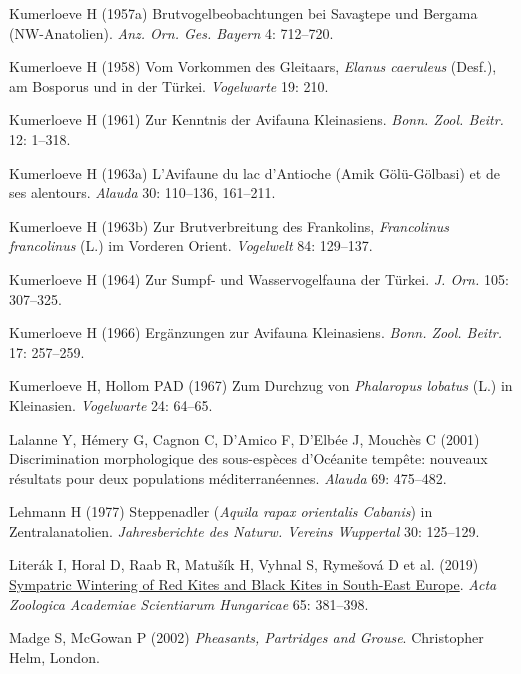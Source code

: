 \documentclass[
  letterpaper,
  DIV=11,
  numbers=noendperiod]{scrreprt}
\newlength{\cslhangindent}
\newenvironment{CSLReferences}[2] %
 {\begin{list}{}{%
  \setlength{\itemindent}{0pt}
  \setlength{\leftmargin}{0pt}
  \setlength{\parsep}{0pt}
  \ifodd #1
   \setlength{\leftmargin}{\cslhangindent}
   \setlength{\itemindent}{-1\cslhangindent}
  \fi
  \setlength{\itemsep}{#2\baselineskip}}}
 {\end{list}}
\begin{document}
\begin{CSLReferences}{0}{1}
Kumerloeve H (1957a) {Brutvogelbeobachtungen bei Savaştepe und Bergama
(NW-Anatolien)}. \emph{Anz. Orn. Ges. Bayern} 4: 712--720.

Kumerloeve H (1958) {Vom Vorkommen des Gleitaars, \emph{Elanus
caeruleus} (Desf.), am Bosporus und in der Türkei}. \emph{Vogelwarte}
19: 210.

Kumerloeve H (1961) {Zur Kenntnis der Avifauna Kleinasiens}. \emph{Bonn.
Zool. Beitr.} 12: 1--318.

Kumerloeve H (1963a) {L'Avifaune du lac d'Antioche (Amik Gölü-Gölbasi)
et de ses alentours}. \emph{Alauda} 30: 110--136, 161--211.

Kumerloeve H (1963b) {Zur Brutverbreitung des Frankolins,
\emph{Francolinus francolinus} (L.) im Vorderen Orient}.
\emph{Vogelwelt} 84: 129--137.

Kumerloeve H (1964) {Zur Sumpf- und Wasservogelfauna der Türkei}.
\emph{J. Orn.} 105: 307--325.

Kumerloeve H (1966) {Ergänzungen zur Avifauna Kleinasiens}. \emph{Bonn.
Zool. Beitr.} 17: 257--259.

Kumerloeve H, Hollom PAD (1967) {Zum Durchzug von \emph{Phalaropus
lobatus} (L.) in Kleinasien}. \emph{Vogelwarte} 24: 64--65.

Lalanne Y, Hémery G, Cagnon C, D'Amico F, D'Elbée J, Mouchès C (2001)
{Discrimination morphologique des sous-espèces d'Océanite tempête:
nouveaux résultats pour deux populations méditerranéennes}.
\emph{Alauda} 69: 475--482.

Lehmann H (1977) {Steppenadler (\emph{Aquila rapax orientalis Cabanis})
in Zentralanatolien}. \emph{Jahresberichte des Naturw. Vereins
Wuppertal} 30: 125--129.

Literák I, Horal D, Raab R, Matušík H, Vyhnal S, Rymešová D et al.
(2019) \href{https://doi.org/10.17109/AZH.65.4.381.2019}{{Sympatric
Wintering of Red Kites and Black Kites in South-East Europe}}.
\emph{Acta Zoologica Academiae Scientiarum Hungaricae} 65: 381--398.

Madge S, McGowan P (2002) \emph{{Pheasants, Partridges and Grouse}}.
Christopher Helm, London.


\end{CSLReferences}
\end{document}
